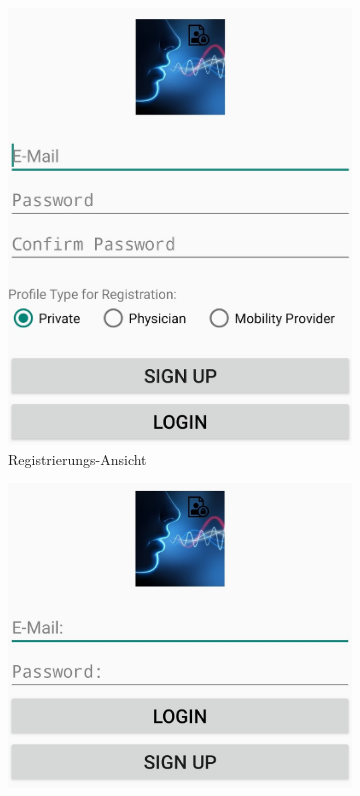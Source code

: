\begin{figure}[!ht]
	\centering
	\begin{subfigure}[t]{0.48\linewidth}
		\centering
		\includegraphics[width=1\linewidth]{Picture/MobileApp_Screenshot-2}
		\caption{Registrierungs-Ansicht}
		\label{fig:prototyp2}
	\end{subfigure}
	\bigskip 
	\begin{subfigure}[t]{0.48\linewidth}
		\centering
		\includegraphics[width=1\linewidth]{Picture/MobileApp_Screenshot-1}

\end{subfigure}
\end{figure}
